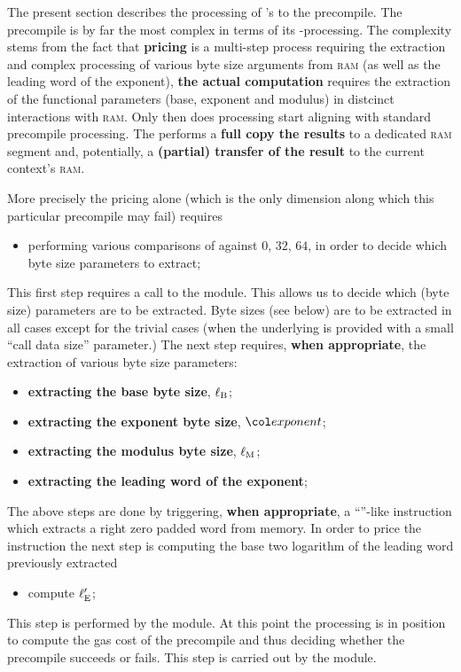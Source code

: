The present section describes the processing of 's to the  precompile.
The  precompile is by far the most complex in terms of its \hubMod{}-processing.
The complexity stems from the fact that
\textbf{pricing} is a multi-step process requiring the extraction and complex processing of various byte size arguments from \textsc{ram} (as well as the leading word of the exponent),
\textbf{the actual computation} requires the extraction of the functional parameters (base, exponent and modulus) in distcinct interactions with \textsc{ram}.
Only then does processing start aligning with standard precompile processing.
The \zkEvm{} performs a \textbf{full copy the results} to a dedicated \textsc{ram} segment
and, potentially, a \textbf{(partial) transfer of the result} to the current context's \textsc{ram}.

More precisely the pricing alone (which is the only dimension along which this particular precompile may fail) requires
\begin{itemize}
	\item performing various comparisons of \locPrcCds{} against $0$, $32$, $64$, in order to decide which byte size parameters to extract;
\end{itemize}
This first step requires a call to the \oobMod{} module.
This allows us to decide which (byte size) parameters are to be extracted.
Byte sizes (see below) are to be extracted in all cases except for the trivial cases (when the underlying  is provided with a small ``call data size'' parameter.)
The next step requires, \textbf{when appropriate}, the extraction of various byte size parameters:
\begin{itemize}
	\item \textbf{extracting the base     byte size}, $\ell_\text{B}$;
	\item \textbf{extracting the exponent byte size}, $\locExponent$;
	\item \textbf{extracting the modulus  byte size}, $\ell_\text{M}$;
	\item \textbf{extracting the leading  word of the exponent};
\end{itemize}
The above steps are done by triggering, \textbf{when appropriate}, a ``''-like instruction which extracts a right zero padded \evm{} word from memory.
In order to price the instruction the next step is computing the base two logarithm of the leading word previously extracted
\begin{itemize}
	\item compute $\ell_\text{E}'$;
\end{itemize}
This step is performed by the \expMod{} module.
At this point the processing is in position to compute the gas cost of the  precompile and thus deciding whether the precompile succeeds or fails.
This step is carried out by the \oobMod{} module.

